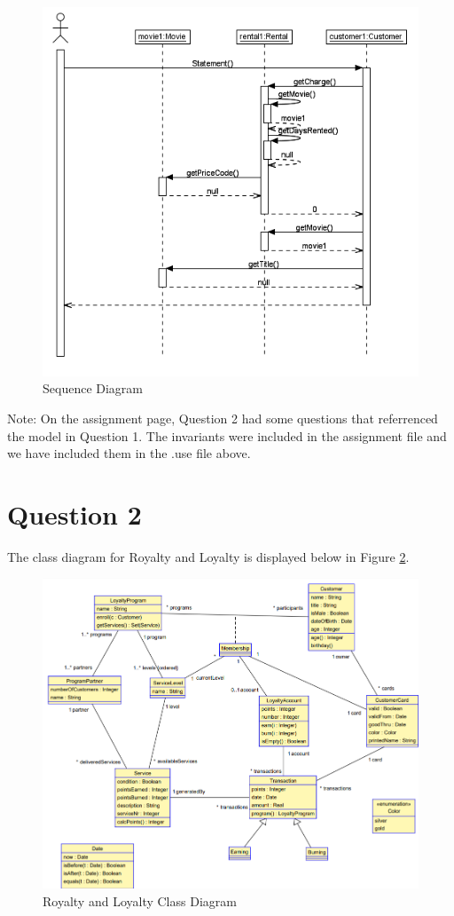 \documentclass{article}
\begin{document}
	\begin{figure}[h]
		\includegraphics[width=\linewidth]{Q1Sequence.PNG}
		\caption{Sequence Diagram}
		\label{fig:q1seq}
	\end{figure}

	\noindent
	Note: On the assignment page, Question 2 had some questions that referrenced the model in Question 1. The invariants were included in the assignment file and we have included them in the .use file above.
	
	\newpage

\section*{Question 2}

	The class diagram for Royalty and Loyalty is displayed below in Figure \ref{fig:q2class}.
	\begin{figure}[h]
		\includegraphics[width=\linewidth]{Q2Class.png}
		\caption{Royalty and Loyalty Class Diagram}
		\label{fig:q2class}
	\end{figure}
	
\end{document}
